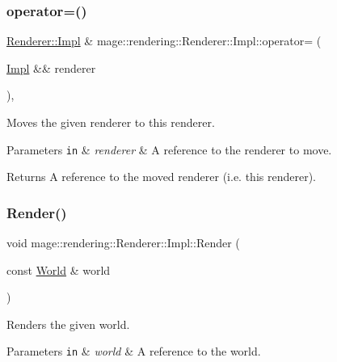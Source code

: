 \subsubsection{\texorpdfstring{operator=()}{operator=()}\hspace{0.1cm}{\footnotesize\ttfamily [2/2]}}
{\footnotesize\ttfamily \hyperlink{classmage_1_1rendering_1_1_renderer_1_1_impl}{Renderer\+::\+Impl} \& mage\+::rendering\+::\+Renderer\+::\+Impl\+::operator= (\begin{DoxyParamCaption}\item[{\hyperlink{classmage_1_1rendering_1_1_renderer_1_1_impl}{Impl} \&\&}]{renderer }\end{DoxyParamCaption})\hspace{0.3cm}{\ttfamily [default]}, {\ttfamily [noexcept]}}

Moves the given renderer to this renderer.


\begin{DoxyParams}[1]{Parameters}
\mbox{\tt in}  & {\em renderer} & A reference to the renderer to move. \\
\hline
\end{DoxyParams}
\begin{DoxyReturn}{Returns}
A reference to the moved renderer (i.\+e. this renderer). 
\end{DoxyReturn}
\hypertarget{classmage_1_1rendering_1_1_renderer_1_1_impl_a7a5817fc34258bc52731e0c26085d857}{}\label{classmage_1_1rendering_1_1_renderer_1_1_impl_a7a5817fc34258bc52731e0c26085d857} 
\subsubsection{\texorpdfstring{Render()}{Render()}\hspace{0.1cm}{\footnotesize\ttfamily [1/2]}}
{\footnotesize\ttfamily void mage\+::rendering\+::\+Renderer\+::\+Impl\+::\+Render (\begin{DoxyParamCaption}\item[{const \hyperlink{classmage_1_1rendering_1_1_world}{World} \&}]{world }\end{DoxyParamCaption})}

Renders the given world.


\begin{DoxyParams}[1]{Parameters}
\mbox{\tt in}  & {\em world} & A reference to the world. \\
\hline
\end{DoxyParams}

